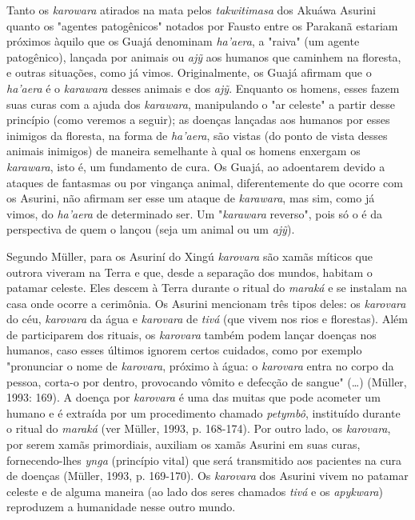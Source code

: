 Tanto os \emph{karowara} atirados na mata pelos \emph{takwitimasa} dos
Akuáwa Asurini quanto os "agentes patogênicos" notados por Fausto entre
os Parakanã estariam próximos àquilo que os Guajá denominam
\emph{ha'aera}, a "raiva" (um agente patogênico), lançada por animais ou
\emph{ajỹ} aos humanos que caminhem na floresta, e outras situações,
como já vimos. Originalmente, os Guajá afirmam que o \emph{ha'aera} é o
\emph{karawara} desses animais e dos \emph{ajỹ}. Enquanto os homens,
esses fazem suas curas com a ajuda dos \emph{karawara}, manipulando o
"ar celeste" a partir desse princípio (como veremos a seguir); as
doenças lançadas aos humanos por esses inimigos da floresta, na forma de
\emph{ha'aera}, são vistas (do ponto de vista desses animais inimigos)
de maneira semelhante à qual os homens enxergam os \emph{karawara}, isto
é, um fundamento de cura. Os Guajá, ao adoentarem devido a ataques de
fantasmas ou por vingança animal, diferentemente do que ocorre com os
Asurini, não afirmam ser esse um ataque de \emph{karawara}, mas sim,
como já vimos, do \emph{ha'aera} de determinado ser. Um "\emph{karawara}
reverso", pois só o é da perspectiva de quem o lançou (seja um animal ou
um \emph{ajỹ}).

Segundo Müller, para os Asuriní do Xingú \emph{karovara} são xamãs
míticos que outrora viveram na Terra e que, desde a separação dos
mundos, habitam o patamar celeste. Eles descem à Terra durante o ritual
do \emph{maraká} e se instalam na casa onde ocorre a cerimônia. Os
Asurini mencionam três tipos deles: os \emph{karovara} do céu,
\emph{karovara} da água e \emph{karovara} de \emph{tivá} (que vivem nos
rios e florestas). Além de participarem dos rituais, os \emph{karovara}
também podem lançar doenças nos humanos, caso esses últimos ignorem
certos cuidados, como por exemplo "pronunciar o nome de \emph{karovara},
próximo à água: o \emph{karovara} entra no corpo da pessoa, corta-o por
dentro, provocando vômito e defecção de sangue" (\ldots{}) (Müller, 1993:
169). A doença por \emph{karovara} é uma das muitas que pode acometer um
humano e é extraída por um procedimento chamado \emph{petymbô},
instituído durante o ritual do \emph{maraká} (ver Müller, 1993, p.
168-174). Por outro lado, os \emph{karovara}, por serem xamãs
primordiais, auxiliam os xamãs Asurini em suas curas, fornecendo-lhes
\emph{ynga} (princípio vital) que será transmitido aos pacientes na cura
de doenças (Müller, 1993, p. 169-170). Os \emph{karovara} dos Asurini
vivem no patamar celeste e de alguma maneira (ao lado dos seres chamados
\emph{tivá} e os \emph{apykwara}) reproduzem a humanidade nesse outro
mundo.


